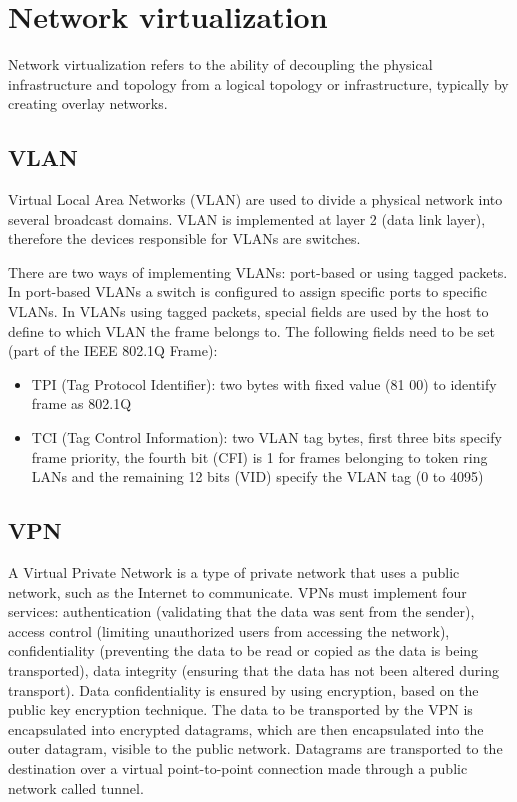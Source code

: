 \chapter{Network virtualization}
Network virtualization refers to the ability of decoupling the physical infrastructure and topology from a logical topology or infrastructure, typically by creating overlay networks.

\section{VLAN}
Virtual Local Area Networks (VLAN) are used to divide a physical network into several broadcast domains. VLAN is implemented at layer 2 (data link layer), therefore the devices responsible for VLANs are switches.

There are two ways of implementing VLANs: port-based or using tagged packets. In port-based VLANs a switch is configured to assign specific ports to specific VLANs. In VLANs using tagged packets, special fields are used by the host to define to which VLAN the frame belongs to. The following fields need to be set (part of the IEEE 802.1Q Frame):
\begin{itemize}
  \item TPI (Tag Protocol Identifier): two bytes with fixed value (81 00) to identify frame as 802.1Q
  \item TCI (Tag Control Information): two VLAN tag bytes, first three bits specify frame priority, the fourth bit (CFI) is 1 for frames belonging to token ring LANs and the remaining 12 bits (VID) specify the VLAN tag (0 to 4095)
\end{itemize}


\section{VPN}
A Virtual Private Network is a type of private network that uses a public network, such as the Internet to communicate. VPNs must implement four services: authentication (validating that the data was sent from the sender), access control (limiting unauthorized users from accessing the network), confidentiality (preventing the data to be read or copied as the data is being transported), data integrity (ensuring that the data has not been altered during transport). Data confidentiality is ensured by using encryption, based on  the public key encryption technique. The data to be transported by the VPN is encapsulated into encrypted datagrams, which are then encapsulated into the outer datagram, visible to the public network. Datagrams are transported to the destination over a virtual point-to-point connection made through a public network called tunnel.

